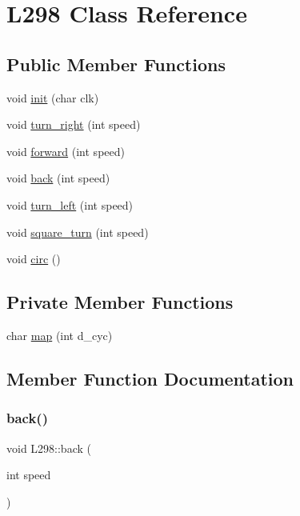 \hypertarget{classL298}{}\section{L298 Class Reference}
\label{classL298}
\subsection*{Public Member Functions}
\begin{DoxyCompactItemize}
\item 
void \hyperlink{classL298_a5f5692e1f1f2649ad5fe43c3ec90b700}{init} (char clk)
\item 
void \hyperlink{classL298_a96b6c3c4a52195343bc19d05aa1efffd}{turn\+\_\+right} (int speed)
\item 
void \hyperlink{classL298_a182d163bdcc06330ffae43b0f49e0742}{forward} (int speed)
\item 
void \hyperlink{classL298_a4d818ee6a1c166a3e00c9e0fd0cf0d59}{back} (int speed)
\item 
void \hyperlink{classL298_a430051b0786596aac92f747121e9535c}{turn\+\_\+left} (int speed)
\item 
void \hyperlink{classL298_a638f680cf5d6dfba25e42ba96e19bee6}{square\+\_\+turn} (int speed)
\item 
void \hyperlink{classL298_added600b7b9c0a46be3474fa7e8b890c}{circ} ()
\end{DoxyCompactItemize}
\subsection*{Private Member Functions}
\begin{DoxyCompactItemize}
\item 
char \hyperlink{classL298_a937f021c405806051271c7ca4ab81fe2}{map} (int d\+\_\+cyc)
\end{DoxyCompactItemize}


\subsection{Member Function Documentation}
\mbox{\label{classL298_a4d818ee6a1c166a3e00c9e0fd0cf0d59}} 
\subsubsection{\texorpdfstring{back()}{back()}}
{\footnotesize\ttfamily void L298\+::back (\begin{DoxyParamCaption}\item[{int}]{speed }\end{DoxyParamCaption})}

